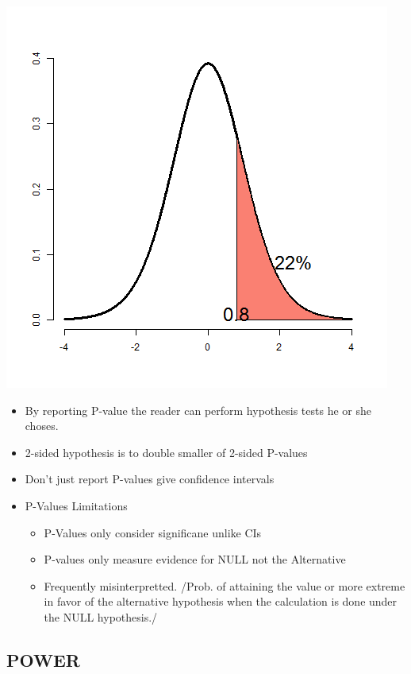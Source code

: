 \documentclass[11pt]{article}
\begin{document}
\includegraphics[width=.9\linewidth]{figure3.png}

\begin{itemize}
\item By reporting P-value the reader can perform hypothesis tests he or
  she choses.
\item 2-sided hypothesis is to double smaller of 2-sided P-values
\item Don't just report P-values give confidence intervals
\end{itemize}
\begin{itemize}

\item P-Values Limitations
\label{sec-1-1-3-1}%
\begin{itemize}
\item P-Values only consider significane unlike CIs
\item P-values only measure evidence for NULL not the Alternative
\item Frequently misinterpretted. /Prob. of attaining the value or more
  extreme in favor of the alternative hypothesis when the calculation
  is done under the NULL hypothesis./
\end{itemize}
 
\end{itemize} %
\subsection{POWER}
\label{sec-1-2}
\end{document}
